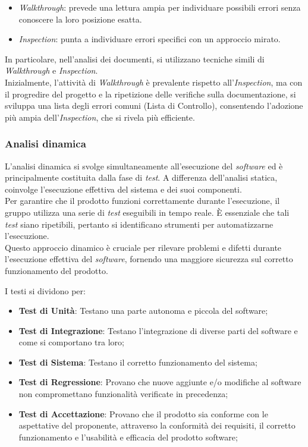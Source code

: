 \documentclass[5pt]{article}
\begin{document}
    \begin{itemize}
    \item \textit{Walkthrough}: prevede una lettura ampia per individuare possibili errori senza conoscere la loro posizione esatta.
    \item \textit{Inspection}: punta a individuare errori specifici con un approccio mirato.
    \end{itemize}
    In particolare, nell'analisi dei documenti, si utilizzano tecniche simili di \textit{Walkthrough} e \textit{Inspection}.\\
    Inizialmente, l'attività di \textit{Walkthrough} è prevalente rispetto all'\textit{Inspection}, ma con il progredire del progetto e la ripetizione delle verifiche sulla documentazione, si sviluppa una lista degli errori comuni (Lista di Controllo), consentendo l'adozione più ampia dell'\textit{Inspection}, che si rivela più efficiente.
    \subsubsection{Analisi dinamica}
    L'analisi dinamica si svolge simultaneamente all'esecuzione del \textit{software} ed è principalmente costituita dalla fase di \textit{test}. A differenza dell'analisi statica, coinvolge l'esecuzione effettiva del sistema e dei suoi componenti.\\
    Per garantire che il prodotto funzioni correttamente durante l'esecuzione, il gruppo utilizza una serie di \textit{test} eseguibili in tempo reale. È essenziale che tali \textit{test} siano ripetibili, pertanto si identificano strumenti per automatizzarne l'esecuzione.\\
    Questo approccio dinamico è cruciale per rilevare problemi e difetti durante l'esecuzione effettiva del \textit{software}, fornendo una maggiore sicurezza sul corretto funzionamento del prodotto.
    
    I testi si dividono per:
    \begin{itemize}
    	\item \textbf{Test di Unità}: Testano una parte autonoma e piccola del software;
    	\item \textbf{Test di Integrazione}: Testano l'integrazione di diverse parti del software e come si comportano tra loro;
    	\item \textbf{Test di Sistema}: Testano il corretto funzionamento del sistema;
    	\item \textbf{Test di Regressione}: Provano che nuove aggiunte e/o modifiche al software non compromettano funzionalità verificate in precedenza;
    	\item \textbf{Test di Accettazione}: Provano che il prodotto sia conforme con le aspettative del proponente, attraverso la conformità dei requisiti, il corretto funzionamento e l'usabilità e efficacia del prodotto software;
    \end{itemize}
    
\end{document}

